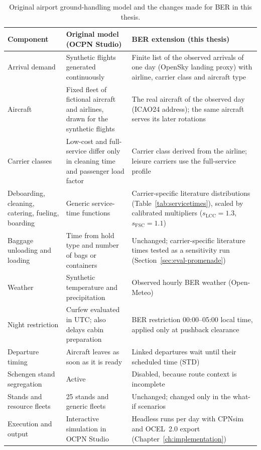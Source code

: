 \begin{table}[htbp]\centering\footnotesize
\begin{tabular}{p{2.4cm}p{4.7cm}p{5.4cm}}\hline
Component & Original model (OCPN Studio) & BER extension (this thesis)\\\hline
Arrival demand & Synthetic flights generated continuously & Finite list of the observed arrivals of one day (OpenSky landing proxy) with airline, carrier class and aircraft type\\\hline
Aircraft & Fixed fleet of fictional aircraft and airlines, drawn for the synthetic flights & The real aircraft of the observed day (ICAO24 address); the same aircraft serves its later rotations\\\hline
Carrier classes & Low-cost and full-service differ only in cleaning time and passenger load factor & Carrier class derived from the airline; leisure carriers use the full-service profile\\\hline
Deboarding, cleaning, catering, fueling, boarding & Generic service-time functions & Carrier-specific literature distributions (Table~\ref{tab:servicetimes}), scaled by calibrated multipliers ($s_{\mathrm{LCC}}=1.3$, $s_{\mathrm{FSC}}=1.1$)\\\hline
Baggage unloading and loading & Time from hold type and number of bags or containers & Unchanged; carrier-specific literature times tested as a sensitivity run (Section~\ref{sec:eval-promenade})\\\hline
Weather & Synthetic temperature and precipitation & Observed hourly BER weather (Open-Meteo)\\\hline
Night restriction & Curfew evaluated in UTC; also delays cabin preparation & BER restriction 00:00--05:00 local time, applied only at pushback clearance\\\hline
Departure timing & Aircraft leaves as soon as it is ready & Linked departures wait until their scheduled time (STD)\\\hline
Schengen stand segregation & Active & Disabled, because route context is incomplete\\\hline
Stands and resource fleets & 25 stands and generic fleets & Unchanged; changed only in the what-if scenarios\\\hline
Execution and output & Interactive simulation in OCPN Studio & Headless runs per day with CPNsim and OCEL~2.0 export (Chapter~\ref{ch:implementation})\\\hline
\end{tabular}
\caption{Original airport ground-handling model and the changes made for BER in this thesis.}
\label{tab:extensions}
\end{table}

